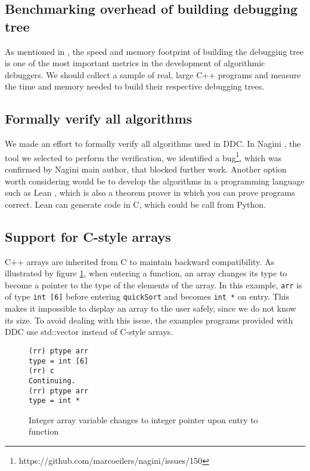 \subsection{Benchmarking overhead of building debugging tree}
As mentioned in \cite{Survey}, the speed and memory footprint of building the debugging tree is one of the most important metrics in the development of algorithmic debuggers.
We should collect a sample of real, large C++ programs and measure the time and memory needed to build their respective debugging trees.
\subsection{Formally verify all algorithms}
We made an effort to formally verify all algorithms used in DDC.
In Nagini \cite{nagini}, the tool we selected to perform the verification, we identified a bug\footnote{https://github.com/marcoeilers/nagini/issues/150}, which was confirmed by Nagini main author, that blocked further work. 
Another option worth considering would be to develop the algorithms in a programming language such as Lean \cite{lean}, which is also a theorem prover in which you can prove programs correct.
Lean can generate code in C, which could be call from Python.
\subsection{Support for C-style arrays}
C++ arrays are inherited from C to maintain backward compatibility.
As illustrated by figure \ref{fig:array_to_pointer}, when entering a function, an array changes its type to become a pointer to the type of the elements of the array.
In this example, \verb|arr| is of type \verb|int [6]| before entering \verb|quickSort| and becomes \verb|int *| on entry.
This makes it impossible to display an array to the user safely, since we do not know its size.
To avoid dealing with this issue, the examples programs provided with DDC use std::vector instead of C-style arrays.
\begin{figure}[h]
    \centering
    \caption{Integer array variable changes to integer pointer upon entry to function}
    \label{fig:array_to_pointer}
    \begin{verbatim}
(rr) ptype arr
type = int [6]
(rr) c
Continuing.
(rr) ptype arr
type = int *
    \end{verbatim}
\end{figure}
